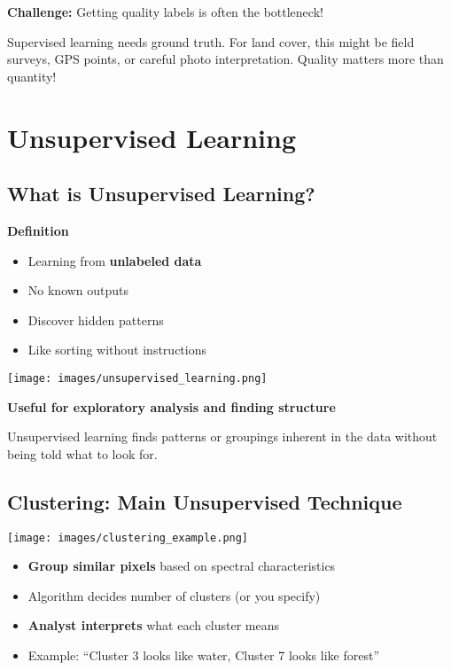 \documentclass[
  letterpaper,
  DIV=11,
  numbers=noendperiod]{scrartcl}
\providecommand{\tightlist}{%
  \setlength{\itemsep}{0pt}\setlength{\parskip}{0pt}}
\begin{document}
\textbf{Challenge:} Getting quality labels is often the bottleneck!

Supervised learning needs ground truth. For land cover, this might be
field surveys, GPS points, or careful photo interpretation. Quality
matters more than quantity!

\section{Unsupervised Learning}\label{unsupervised-learning}

\subsection{What is Unsupervised
Learning?}\label{what-is-unsupervised-learning}

\textbf{Definition}

\begin{itemize}
\tightlist
\item
  Learning from \textbf{unlabeled data}
\item
  No known outputs
\item
  Discover hidden patterns
\item
  Like sorting without instructions
\end{itemize}

\texttt{[image: images/unsupervised\_learning.png]}

\textbf{Useful for exploratory analysis and finding structure}

Unsupervised learning finds patterns or groupings inherent in the data
without being told what to look for.

\subsection{Clustering: Main Unsupervised
Technique}\label{clustering-main-unsupervised-technique}

\begin{center}
\texttt{[image: images/clustering\_example.png]}
\end{center}

\begin{itemize}
\tightlist
\item
  \textbf{Group similar pixels} based on spectral characteristics
\item
  Algorithm decides number of clusters (or you specify)
\item
  \textbf{Analyst interprets} what each cluster means
\item
  Example: ``Cluster 3 looks like water, Cluster 7 looks like forest''
\end{itemize}
\end{document}
